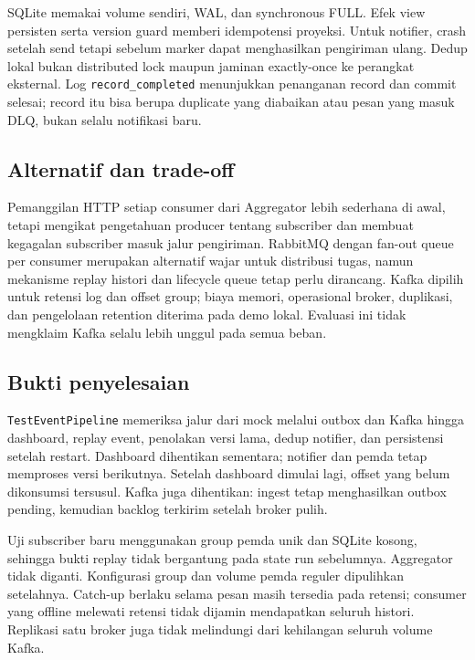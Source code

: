 SQLite memakai volume sendiri, WAL, dan synchronous FULL. Efek view persisten serta version guard memberi idempotensi proyeksi. Untuk notifier, crash setelah send tetapi sebelum marker dapat menghasilkan pengiriman ulang. Dedup lokal bukan distributed lock maupun jaminan exactly-once ke perangkat eksternal. Log \texttt{record\_completed} menunjukkan penanganan record dan commit selesai; record itu bisa berupa duplicate yang diabaikan atau pesan yang masuk DLQ, bukan selalu notifikasi baru.

\subsection{Alternatif dan trade-off}
Pemanggilan HTTP setiap consumer dari Aggregator lebih sederhana di awal, tetapi mengikat pengetahuan producer tentang subscriber dan membuat kegagalan subscriber masuk jalur pengiriman. RabbitMQ dengan fan-out queue per consumer merupakan alternatif wajar untuk distribusi tugas, namun mekanisme replay histori dan lifecycle queue tetap perlu dirancang. Kafka dipilih untuk retensi log dan offset group; biaya memori, operasional broker, duplikasi, dan pengelolaan retention diterima pada demo lokal. Evaluasi ini tidak mengklaim Kafka selalu lebih unggul pada semua beban.

\subsection{Bukti penyelesaian}
\texttt{TestEventPipeline} memeriksa jalur dari mock melalui outbox dan Kafka hingga dashboard, replay event, penolakan versi lama, dedup notifier, dan persistensi setelah restart. Dashboard dihentikan sementara; notifier dan pemda tetap memproses versi berikutnya. Setelah dashboard dimulai lagi, offset yang belum dikonsumsi tersusul. Kafka juga dihentikan: ingest tetap menghasilkan outbox pending, kemudian backlog terkirim setelah broker pulih.

Uji subscriber baru menggunakan group pemda unik dan SQLite kosong, sehingga bukti replay tidak bergantung pada state run sebelumnya. Aggregator tidak diganti. Konfigurasi group dan volume pemda reguler dipulihkan setelahnya. Catch-up berlaku selama pesan masih tersedia pada retensi; consumer yang offline melewati retensi tidak dijamin mendapatkan seluruh histori. Replikasi satu broker juga tidak melindungi dari kehilangan seluruh volume Kafka.
